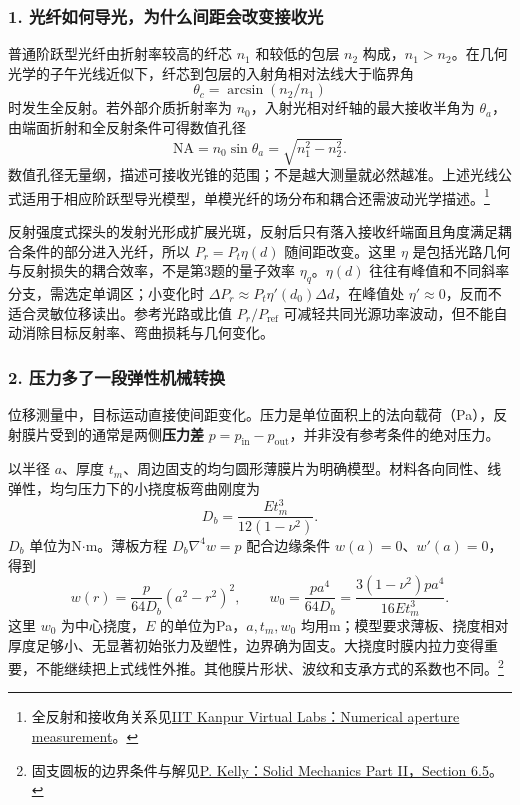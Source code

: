 \subsubsection*{1. 光纤如何导光，为什么间距会改变接收光}
普通阶跃型光纤由折射率较高的纤芯 $n_1$ 和较低的包层 $n_2$ 构成，$n_1>n_2$。在几何光学的子午光线近似下，纤芯到包层的入射角相对法线大于临界角
\[
\theta_c=\arcsin(n_2/n_1)
\]
时发生全反射。若外部介质折射率为 $n_0$，入射光相对纤轴的最大接收半角为 $\theta_a$，由端面折射和全反射条件可得数值孔径
\[
\boxed{\mathrm{NA}=n_0\sin\theta_a=\sqrt{n_1^2-n_2^2}}.
\]
数值孔径无量纲，描述可接收光锥的范围；不是越大测量就必然越准。上述光线公式适用于相应阶跃型导光模型，单模光纤的场分布和耦合还需波动光学描述。\footnote{全反射和接收角关系见\href{https://bop-iitk.vlabs.ac.in/exp/numerical-aperture-measurement/theory.html}{IIT Kanpur Virtual Labs：Numerical aperture measurement}。}

反射强度式探头的发射光形成扩展光斑，反射后只有落入接收纤端面且角度满足耦合条件的部分进入光纤，所以 $P_r=P_t\eta(d)$ 随间距改变。这里 $\eta$ 是包括光路几何与反射损失的耦合效率，不是第3题的量子效率 $\eta_q$。$\eta(d)$ 往往有峰值和不同斜率分支，需选定单调区；小变化时 $\Delta P_r\approx P_t\eta'(d_0)\Delta d$，在峰值处 $\eta'\approx0$，反而不适合灵敏位移读出。参考光路或比值 $P_r/P_{\mathrm{ref}}$ 可减轻共同光源功率波动，但不能自动消除目标反射率、弯曲损耗与几何变化。

\subsubsection*{2. 压力多了一段弹性机械转换}
位移测量中，目标运动直接使间距变化。压力是单位面积上的法向载荷（Pa），反射膜片受到的通常是两侧\textbf{压力差} $p=p_{\mathrm{in}}-p_{\mathrm{out}}$，并非没有参考条件的绝对压力。

以半径 $a$、厚度 $t_m$、周边固支的均匀圆形薄膜片为明确模型。材料各向同性、线弹性，均匀压力下的小挠度板弯曲刚度为
\[
D_b=\frac{Et_m^3}{12(1-\nu^2)}.
\]
$D_b$ 单位为N$\cdot$m。薄板方程 $D_b\nabla^4w=p$ 配合边缘条件 $w(a)=0$、$w'(a)=0$，得到
\[
w(r)=\frac{p}{64D_b}(a^2-r^2)^2,
\qquad
\boxed{w_0=\frac{pa^4}{64D_b}
=\frac{3(1-\nu^2)pa^4}{16Et_m^3}}.
\]
这里 $w_0$ 为中心挠度，$E$ 的单位为Pa，$a,t_m,w_0$ 均用m；模型要求薄板、挠度相对厚度足够小、无显著初始张力及塑性，边界确为固支。大挠度时膜内拉力变得重要，不能继续把上式线性外推。其他膜片形状、波纹和支承方式的系数也不同。\footnote{固支圆板的边界条件与解见\href{https://pkel015.connect.amazon.auckland.ac.nz/SolidMechanicsBooks/Part_II/06_PlateTheory/06_PlateTheory_05_RectangularCoordinates.pdf}{P. Kelly：Solid Mechanics Part II，Section 6.5}。}

